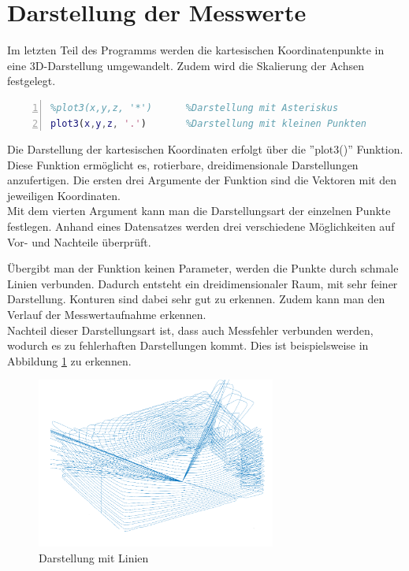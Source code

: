 \section{Darstellung der Messwerte}

Im letzten Teil des Programms werden die kartesischen Koordinatenpunkte in eine 3D-Darstellung umgewandelt. Zudem wird die Skalierung der Achsen festgelegt.


\begin{lstlisting}[caption={Darstellung der Messwerte},language={Matlab}, label={import_data}, numbers=left]
%plot3(x,y,z)			%Darstellung mit Linien
%plot3(x,y,z, '*')		%Darstellung mit Asteriskus 
plot3(x,y,z, '.')		%Darstellung mit kleinen Punkten
\end{lstlisting}

Die Darstellung der kartesischen Koordinaten erfolgt über die ''plot3()'' Funktion. Diese Funktion ermöglicht es, rotierbare, dreidimensionale Darstellungen anzufertigen. Die ersten drei Argumente der Funktion sind die Vektoren mit den jeweiligen Koordinaten.\\
Mit dem vierten Argument kann man die Darstellungsart der einzelnen Punkte festlegen. Anhand eines Datensatzes werden drei verschiedene Möglichkeiten auf Vor- und Nachteile überprüft.

Übergibt man der Funktion keinen Parameter, werden die Punkte durch schmale Linien verbunden. Dadurch entsteht ein dreidimensionaler Raum, mit sehr feiner Darstellung. Konturen sind dabei sehr gut zu erkennen. Zudem kann man den Verlauf der Messwertaufnahme erkennen. \\
Nachteil dieser Darstellungsart ist, dass auch Messfehler verbunden werden, wodurch es zu fehlerhaften Darstellungen kommt. Dies ist beispielsweise in Abbildung \ref{linien} zu erkennen.


\begin{figure}[H]
	\centering
	\includegraphics[width=0.7\textwidth]{images/Auswertung/Linien}
	\caption{Darstellung mit Linien}
	\label{linien}
\end{figure}


